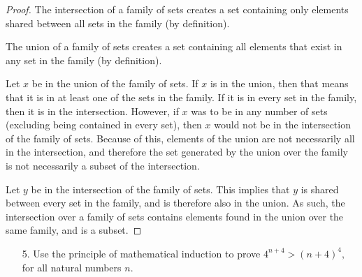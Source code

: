 \documentclass[10pt]{article}
\theoremstyle{definition}
\theoremstyle{plain}
\begin{document}
\begin{proof}
  The intersection of a family of sets creates a set containing only elements shared between all sets in the family (by definition). \\

  \par The union of a family of sets creates a set containing all elements that exist in any set in the family (by definition). \\

  \par Let $x$ be in the union of the family of sets. If $x$ is in the union, then that means that it is in at least one of the sets in the family. If it is in every set in the family, then it is in the intersection. However, if $x$ was to be in any number of sets (excluding being contained in every set), then $x$ would not be in the intersection of the family of sets. Because of this, elements of the union are not necessarily all in the intersection, and therefore the set generated by the union over the family is not necessarily a subset of the intersection. \\

  \par Let $y$ be in the intersection of the family of sets. This implies that $y$ is shared between every set in the family, and is therefore also in the union. As such, the intersection over a family of sets contains elements found in the union over the same family, and is a subset.
\end{proof}



\pagebreak



\begin{enumerate}
  \item[5.] Use the principle of mathematical induction to prove $4^{n+4} > (n+4)^4,$ for all natural numbers $n$.
\end{enumerate}
\end{document}
